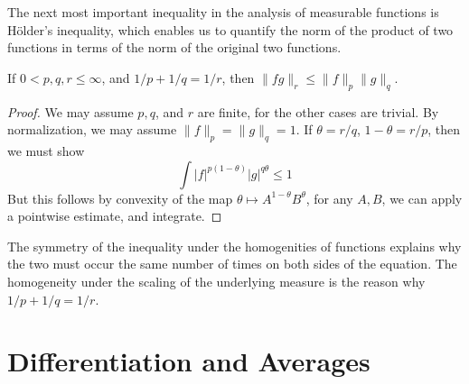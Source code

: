 The next most important inequality in the analysis of measurable functions is H\"{o}lder's inequality, which enables us to quantify the norm of the product of two functions in terms of the norm of the original two functions.

\begin{theorem}
  If $0 < p,q,r \leq \infty$, and $1/p + 1/q = 1/r$, then $\| fg \|_r \leq \| f \|_p \| g \|_q$.
\end{theorem}
\begin{proof}
  We may assume $p,q$, and $r$ are finite, for the other cases are trivial. By normalization, we may assume $\| f \|_p = \| g \|_q = 1$. If $\theta = r/q$, $1 - \theta = r/p$, then we must show
  \[ \int |f|^{p(1 - \theta)} |g|^{q\theta} \leq 1 \]
  But this follows by convexity of the map $\theta \mapsto A^{1 - \theta} B^\theta$, for any $A,B$, we can apply a pointwise estimate, and integrate.
\end{proof}

\begin{remark}
  The symmetry of the inequality under the homogenities of functions explains why the two must occur the same number of times on both sides of the equation. The homogeneity under the scaling of the underlying measure is the reason why $1/p + 1/q = 1/r$.
\end{remark}






























\chapter{Differentiation and Averages}

%
%

